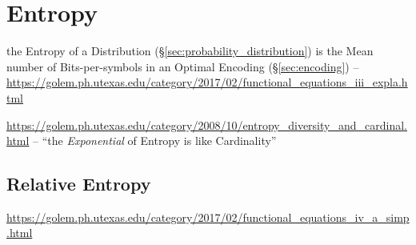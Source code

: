 \section{Entropy}\label{sec:entropy}

the Entropy of a Distribution (\S\ref{sec:probability_distribution})
is the Mean number of Bits-per-symbols in an Optimal Encoding
(\S\ref{sec:encoding}) --
\url{https://golem.ph.utexas.edu/category/2017/02/functional_equations_iii_expla.html}

\url{https://golem.ph.utexas.edu/category/2008/10/entropy_diversity_and_cardinal.html}
-- ``the \emph{Exponential} of Entropy is like Cardinality''



\subsection{Relative Entropy}\label{sec:relative_entropy}

\url{https://golem.ph.utexas.edu/category/2017/02/functional_equations_iv_a_simp.html}
